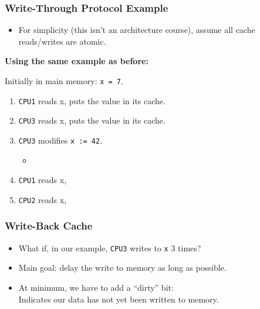 \begin{frame}
  \frametitle{Write-Through Protocol Example}

  

  \begin{itemize}
    \item For simplicity (this isn't an architecture course), assume all cache
      reads/writes are atomic.
  \end{itemize}
  \vfill
  {\bf Using the same example as before:}

  Initially in main memory: {\tt x = 7}.

  \begin{enumerate}
    \item {\tt CPU1} reads x, puts the value in its cache. 
    \item {\tt CPU3} reads x, puts the value in its cache. 
    \item {\tt CPU3} modifies {\tt x := 42}. 
      \begin{itemize}
        \item {}
      \end{itemize}
    \item {\tt CPU1} reads x, 
    \item {\tt CPU2} reads x, 
  \end{enumerate}
  
\end{frame}

\begin{frame}
  \frametitle{Write-Back Cache}


  \begin{itemize}
    \item What if, in our example, {\tt CPU3} writes to {\tt x} 3 times?\\[1em]
    \item Main goal: delay the write to memory as long as possible.\\[1em]
    \item At minimum, we have to add a ``dirty'' bit:\\
     \quad Indicates our data has not yet been written to memory.
  \end{itemize}
  

\end{frame}

